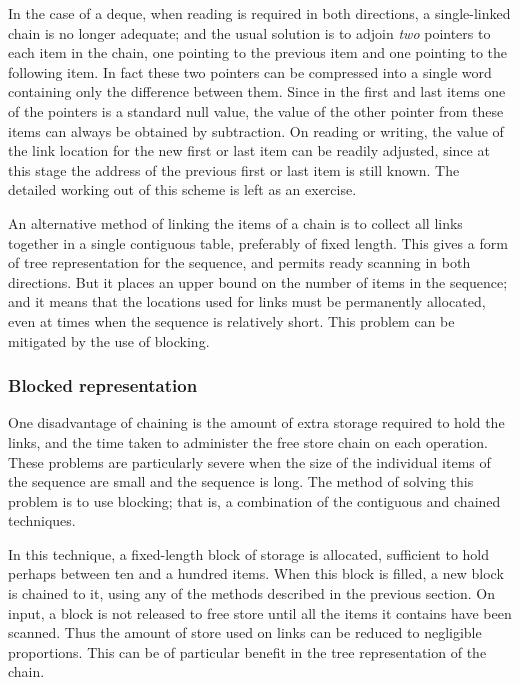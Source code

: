 In the case of a deque, when reading is required in both directions, a single-linked chain is no longer adequate; and the usual solution is to adjoin \textit{two} pointers to each item in the chain, one pointing to the previous item and one pointing to the following item. In fact these two pointers can be compressed into a single word containing only the difference between them. Since in the first and last items one of the pointers is a standard null value, the value of the other pointer from these items can always be obtained by subtraction. On reading or writing, the value of the link location for the new first or last item can be readily adjusted, since at this stage the address of the previous first or last item is still known. The detailed working out of this scheme is left as an exercise.

An alternative method of linking the items of a chain is to collect all links together in a single contiguous table, preferably of fixed length. This gives a form of tree representation for the sequence, and permits ready scanning in both directions. But it places an upper bound on the number of items in the sequence; and it means that the locations used for links must be permanently allocated, even at times when the sequence is relatively short. This problem can be mitigated by the use of blocking.

\subsubsection{Blocked representation}

One disadvantage of chaining is the amount of extra storage required to hold the links, and the time taken to administer the free store chain on each operation. These problems are particularly severe when the size of the individual items of the sequence are small and the sequence is long. The method of solving this problem is to use blocking; that is, a combination of the contiguous and chained techniques.

In this technique, a fixed-length block of storage is allocated, sufficient to hold perhaps between ten and a hundred items. When this block is filled, a new block is chained to it, using any of the methods described in the previous section. On input, a block is not released to free store until all the items it contains have been scanned. Thus the amount of store used on links can be reduced to negligible proportions. This can be of particular benefit in the tree representation of the chain.

